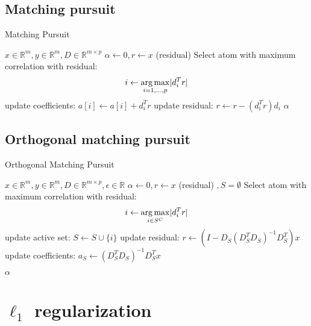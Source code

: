 \subsection{Matching pursuit}
\label{sec:mp}
\begin{algorithm}
\caption{Matching Pursuit}
\begin{algorithmic}[1]
\REQUIRE $x \in \mathbb{R}^m, y \in \mathbb{R}^m, D \in \mathbb{R}^{m\times p}$
\STATE $\alpha \gets 0, r \gets x $ (residual) 
\STATE Select atom with maximum correlation with residual: 
\begin{equation*}
i \gets \operatorname*{arg\,max}_{i=1,...,p} \lvert d_i^Tr \rvert
\end{equation*}
\STATE update coefficients: $a[i]  \gets a[i] + d_i^Tr$
\STATE update residual: $r \gets r - \left(d_i^Tr\right)d_i$
\ENDWHILE
\RETURN $\alpha$
\end{algorithmic}
\end{algorithm}
\subsection{Orthogonal matching pursuit}
\cite{Pati1993}
\label{sec:omp}


\begin{algorithm}
\caption{Orthogonal Matching Pursuit}
\begin{algorithmic}[1]
\REQUIRE $x \in \mathbb{R}^m, y \in \mathbb{R}^m, D \in \mathbb{R}^{m\times p}, \epsilon \in \mathbb{R}$
\STATE $\alpha \gets 0, r \gets x $ (residual) $, S=\emptyset$
\STATE Select atom with maximum correlation with residual: 
\begin{equation*}
i \gets \operatorname*{arg\,max}_{i \in S^C} \lvert d_i^Tr \rvert
\end{equation*}
\STATE update active set: $S \gets S \cup \{i\} $
\STATE update residual: $r \gets \left(I-D_S\left( D_S^T D_S \right)^{-1} D_S^T \right)x$
\STATE update coefficients: $a_S \gets \left( D_S^T D_S \right)^{-1} D_S^T x $

\ENDFOR
\RETURN $\alpha$
\end{algorithmic}
\end{algorithm}

\section {$\ell_1$ regularization}

